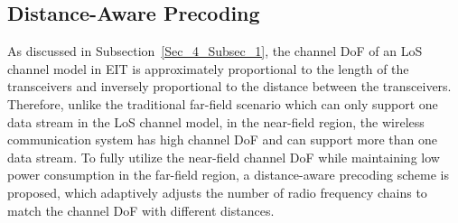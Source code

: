 \documentclass[journal,twocolumn]{IEEEtran}
\begin{document}
\subsection{Distance-Aware Precoding}
As discussed in Subsection~\ref{Sec_4_Subsec_1}, the channel DoF of an LoS channel model in EIT is approximately proportional to the length of the transceivers and inversely proportional to the distance between the transceivers. 
Therefore, unlike the traditional far-field scenario which can only support one data stream in the LoS channel model, in the near-field region, the wireless communication system has high channel DoF and can support more than one data stream.
To fully utilize the near-field channel DoF while maintaining low power consumption in the far-field region, a distance-aware precoding scheme is proposed, which adaptively adjusts the number of radio frequency chains to match the channel DoF with different distances.   


\end{document}
